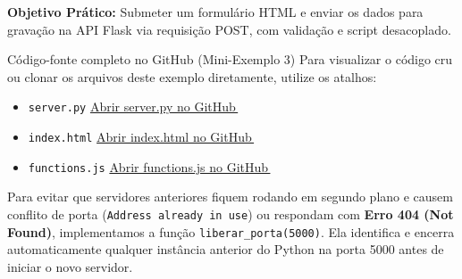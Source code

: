 \begin{boxAtividade}
\textbf{Objetivo Prático:} Submeter um formulário HTML e enviar os dados para gravação na API Flask via requisição POST, com validação e script desacoplado.
\end{boxAtividade}

\begin{repositorio}{Código-fonte completo no GitHub (Mini-Exemplo 3)}
Para visualizar o código cru ou clonar os arquivos deste exemplo diretamente, utilize os atalhos:
\begin{itemize}[nosep]
  \item \texttt{server.py} \seta \href{https://github.com/chameoandre/CST-Sistemas-para-internet-programacao-para-internet-2/blob/main/roteiro-5/mini-exemplos/03-fetch-post/server.py}{Abrir server.py no GitHub\,{\scriptsize\faExternalLinkAlt}}
  \item \texttt{index.html} \seta \href{https://github.com/chameoandre/CST-Sistemas-para-internet-programacao-para-internet-2/blob/main/roteiro-5/mini-exemplos/03-fetch-post/index.html}{Abrir index.html no GitHub\,{\scriptsize\faExternalLinkAlt}}
  \item \texttt{functions.js} \seta \href{https://github.com/chameoandre/CST-Sistemas-para-internet-programacao-para-internet-2/blob/main/roteiro-5/mini-exemplos/03-fetch-post/functions.js}{Abrir functions.js no GitHub\,{\scriptsize\faExternalLinkAlt}}
\end{itemize}
\end{repositorio}

\begin{boxDica}
Para evitar que servidores anteriores fiquem rodando em segundo plano e causem conflito de porta (\texttt{Address already in use}) ou respondam com \textbf{Erro 404 (Not Found)}, implementamos a função \texttt{liberar\_porta(5000)}. Ela identifica e encerra automaticamente qualquer instância anterior do Python na porta 5000 antes de iniciar o novo servidor.
\end{boxDica}

